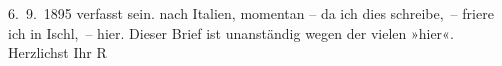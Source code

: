 \begin{ledgroupsized}[t]{13cm}
{{{                     6. 9. 1895 verfasst sein.}}}\label{K_L00366_1h} nach Italien, momentan – {\pb}da ich dies schreibe, – friere
               ich in Ischl, – hier. Dieser Brief ist
               unanständig wegen der vielen »hier«.\pend
           \pstart Herzlichst Ihr \spacefill\mbox{R}\pend{}          \endnumbering{}\end{ledgroupsized}  \newcommand{\dateiname}{L00366}\newcommand{\titel}{Richard Beer-Hofmann an Arthur Schnitzler, [5./6.? 9. 1894]}\newcommand{\editorInnen}{Martin Anton Müller und Gerd-Hermann Susen}
            \footnotesize
\begin{ledgroupsized}[t]{11.5cm}
\end{ledgroupsized}
         
      